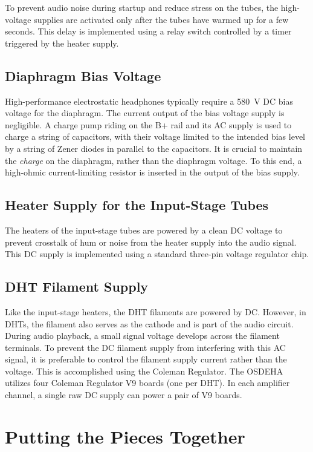 To prevent audio noise during startup and reduce stress on the tubes, the high-voltage supplies are activated only after the tubes have warmed up for a few seconds. This delay is implemented using a relay switch controlled by a timer triggered by the heater supply.

\subsection{Diaphragm Bias Voltage}
High-performance electrostatic headphones typically require a \SI{580}{V} DC bias voltage for the diaphragm. The current output of the bias voltage supply is negligible. A charge pump riding on the B+ rail and its AC supply is used to charge a string of capacitors, with their voltage limited to the intended bias level by a string of Zener diodes in parallel to the capacitors. It is crucial to maintain the \emph{charge} on the diaphragm, rather than the diaphragm voltage. To this end, a high-ohmic current-limiting resistor is inserted in the output of the bias supply.

\subsection{Heater Supply for the Input-Stage Tubes}
The heaters of the input-stage tubes are powered by a clean DC voltage to prevent crosstalk of hum or noise from the heater supply into the audio signal. This DC supply is implemented using a standard three-pin voltage regulator chip.

\subsection{DHT Filament Supply}
Like the input-stage heaters, the DHT filaments are powered by DC. However, in DHTs, the filament also serves as the cathode and is part of the audio circuit. During audio playback, a small signal voltage develops across the filament terminals. To prevent the DC filament supply from interfering with this AC signal, it is preferable to control the filament supply current rather than the voltage. This is accomplished using the Coleman Regulator\cite{ColemanDTHFilReg}. The OSDEHA utilizes four Coleman Regulator V9 boards (one per DHT). In each amplifier channel, a single raw DC supply can power a pair of V9 boards.


\section{Putting the Pieces Together}

